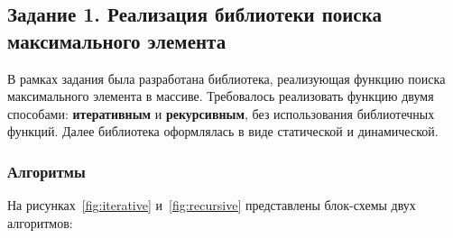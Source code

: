 \subsection{Задание 1. Реализация библиотеки поиска максимального элемента}

В рамках задания была разработана библиотека, реализующая функцию поиска максимального элемента в массиве. Требовалось реализовать функцию двумя способами: \textbf{итеративным} и \textbf{рекурсивным}, без использования библиотечных функций. Далее библиотека оформлялась в виде статической и динамической.

\subsubsection{Алгоритмы}

На рисунках~\ref{fig:iterative} и~\ref{fig:recursive} представлены блок-схемы двух алгоритмов:

